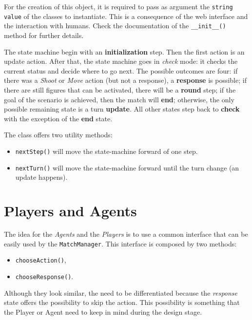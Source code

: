 \documentclass[a4paper]{report}
\begin{document}
	For the creation of this object, it is required to pass as argument the \texttt{string value} of the classes to instantiate. This is a consequence of the web interface and the interaction with humans. Check the documentation of the \texttt{\_\_init\_\_()} method for further details.
	
	The state machine begin with an \textbf{initialization} step. Then the first action is an update action. After that, the state machine goes in \textit{check} mode: it checks the current status and decide where to go next. The possible outcomes are four: if there was a \textit{Shoot} or \textit{Move} action (but not a response), a \textbf{response} is possible; if there are still figures that can be activated, there will be a \textbf{round} step; if the goal of the scenario is achieved, then the match will \textbf{end}; otherwise, the only possible remaining state is a turn \textbf{update}. All other states step back to \textbf{check} with the exception of the \textbf{end} state.

	The class offers two utility methods:
	
	\begin{itemize}
		\item \texttt{nextStep()} will move the state-machine forward of one step.
		\item \texttt{nextTurn()} will move the state-machine forward until the turn change (an update happens).
	\end{itemize}


	\chapter{Players and Agents}

	The idea for the \textit{Agents} and the \textit{Players} is to use a common interface that can be easily used by the \texttt{MatchManager}. This interface is composed by two methods:

	\begin{itemize}
		\item \texttt{chooseAction()},
		\item \texttt{chooseResponse()}.
	\end{itemize}

	Although they look similar, the need to be differentiated because the \textit{response} state offers the possibility to skip the action. This possibility is something that the Player or Agent need to keep in mind during the design stage.
\end{document}
